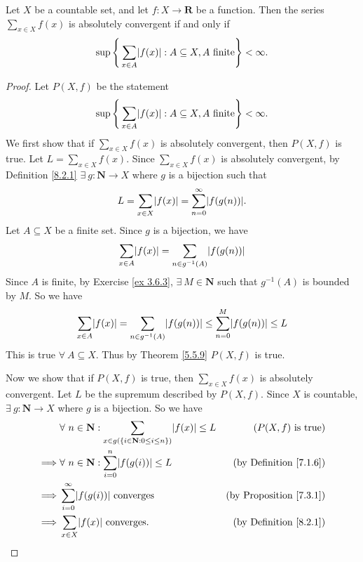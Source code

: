 \begin{lemma}\label{8.2.3}
    Let \(X\) be a countable set, and let \(f : X \to \mathbf{R}\) be a function.
    Then the series \(\sum_{x \in X} f(x)\) is absolutely convergent if and only if
    \[
        \sup\Bigg\{\sum_{x \in A} \abs*{f(x)} : A \subseteq X, A \text{ finite}\Bigg\} < \infty.
    \]
\end{lemma}

\begin{proof}
    Let \(P(X, f)\) be the statement
    \[
        \sup\Bigg\{\sum_{x \in A} \abs*{f(x)} : A \subseteq X, A \text{ finite}\Bigg\} < \infty.
    \]
    We first show that if \(\sum_{x \in X} f(x)\) is absolutely convergent, then \(P(X, f)\) is true.
    Let \(L = \sum_{x \in X} f(x)\).
    Since \(\sum_{x \in X} f(x)\) is absolutely convergent, by Definition \ref{8.2.1} \(\exists\ g : \mathbf{N} \to X\) where \(g\) is a bijection such that
    \[
        L = \sum_{x \in X} \abs*{f(x)} = \sum_{n = 0}^\infty \abs*{f(g(n))}.
    \]
    Let \(A \subseteq X\) be a finite set.
    Since \(g\) is a bijection, we have
    \[
        \sum_{x \in A} \abs*{f(x)} = \sum_{n \in g^{-1}(A)} \abs*{f(g(n))}
    \]
    Since \(A\) is finite, by Exercise \ref{ex 3.6.3}, \(\exists\ M \in \mathbf{N}\) such that \(g^{-1}(A)\) is bounded by \(M\).
    So we have
    \[
        \sum_{x \in A} \abs*{f(x)} = \sum_{n \in g^{-1}(A)} \abs*{f(g(n))} \leq \sum_{n = 0}^M \abs*{f(g(n))} \leq L
    \]
    This is true \(\forall\ A \subseteq X\).
    Thus by Theorem \ref{5.5.9} \(P(X, f)\) is true.

    Now we show that if \(P(X, f)\) is true, then \(\sum_{x \in X} f(x)\) is absolutely convergent.
    Let \(L\) be the supremum described by \(P(X, f)\).
    Since \(X\) is countable, \(\exists\ g : \mathbf{N} \to X\) where \(g\) is a bijection.
    So we have
    \begin{align*}
                 & \forall\ n \in \mathbf{N} : \sum_{x \in g(\{i \in \mathbf{N} : 0 \leq i \leq n\})} \abs*{f(x)} \leq L & (P(X, f) \text{ is true})           \\
        \implies & \forall\ n \in \mathbf{N} : \sum_{i = 0}^n \abs*{f(g(i))} \leq L                                      & \text{(by Definition \ref{7.1.6})}  \\
        \implies & \sum_{i = 0}^\infty \abs*{f(g(i))} \text{ converges}                                                  & \text{(by Proposition \ref{7.3.1})} \\
        \implies & \sum_{x \in X} \abs*{f(x)} \text{ converges}.                                                         & \text{(by Definition \ref{8.2.1})}
    \end{align*}
\end{proof}

